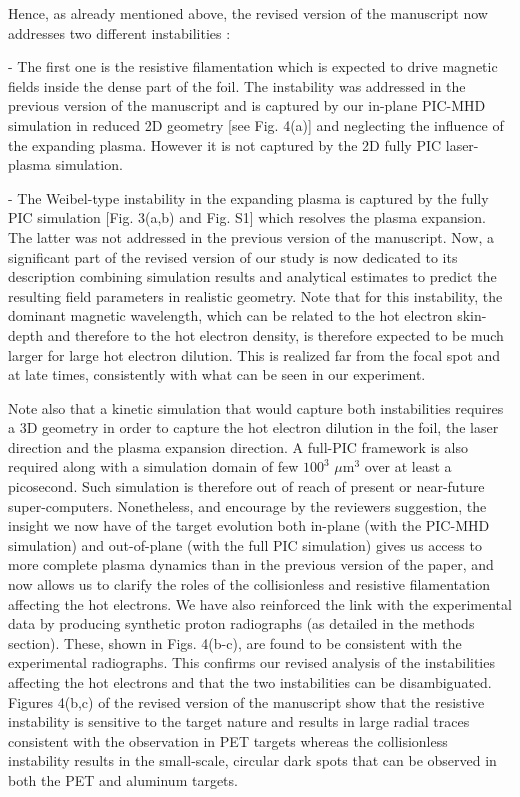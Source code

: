 \documentclass[aps,showpacs,superscriptaddress]{revtex4}%
\begin{document}
\begin{enumerate}
Hence, as already mentioned above, the revised version of the manuscript now addresses two different instabilities :

- The first one is the resistive filamentation which is expected to drive magnetic fields inside the dense part of the foil. The instability was addressed in the previous version of the manuscript and is captured by our in-plane PIC-MHD simulation in reduced 2D geometry [see Fig. 4(a)] and neglecting the influence of the expanding plasma. However it is not captured by the 2D fully PIC laser-plasma simulation.

- The Weibel-type instability    in the expanding plasma is    captured by the fully PIC simulation [Fig. 3(a,b) and Fig. S1]  which resolves the plasma expansion.
 The latter was not addressed in the previous version of the manuscript. Now, a significant part of the revised version of our study is now dedicated to its description combining simulation results and analytical estimates to predict the resulting field parameters in realistic geometry.
Note that for this instability,  the dominant magnetic wavelength, which can  be related to the hot electron skin-depth and therefore to the hot electron density, is therefore expected to be much larger for large hot electron dilution. 
This is realized far from the focal spot and at late times, consistently with what can be seen in our experiment.

Note also that a kinetic simulation that would capture both instabilities requires a 3D geometry in order to capture the hot electron dilution in the foil, the laser direction and the plasma expansion direction.  A full-PIC framework is also required along with a simulation domain of  few   $100^3$ $\mu$m$^3$   over at least a picosecond. Such simulation is therefore out of reach of present or near-future super-computers.
Nonetheless, and encourage by the reviewers suggestion, the insight we now have of the target evolution both in-plane (with the PIC-MHD simulation) and out-of-plane (with the full PIC simulation) gives us access to more complete plasma dynamics than in the previous version of the paper, and now allows us to clarify the roles of the collisionless and resistive filamentation affecting the hot electrons.
We have also reinforced the link with the experimental data by producing synthetic proton radiographs (as detailed in the methods section). These, shown in Figs. 4(b-c), are found to be consistent with the experimental radiographs. This confirms  our revised analysis of the instabilities affecting the hot electrons and that the two instabilities can be disambiguated.  Figures 4(b,c) of  the revised version of the manuscript show that the resistive instability is sensitive to the target nature and results in large radial traces consistent with the observation in PET targets whereas  the collisionless instability  results in the small-scale, circular dark spots  that can be observed in both the PET and aluminum targets.

\end{enumerate}
\end{document}
